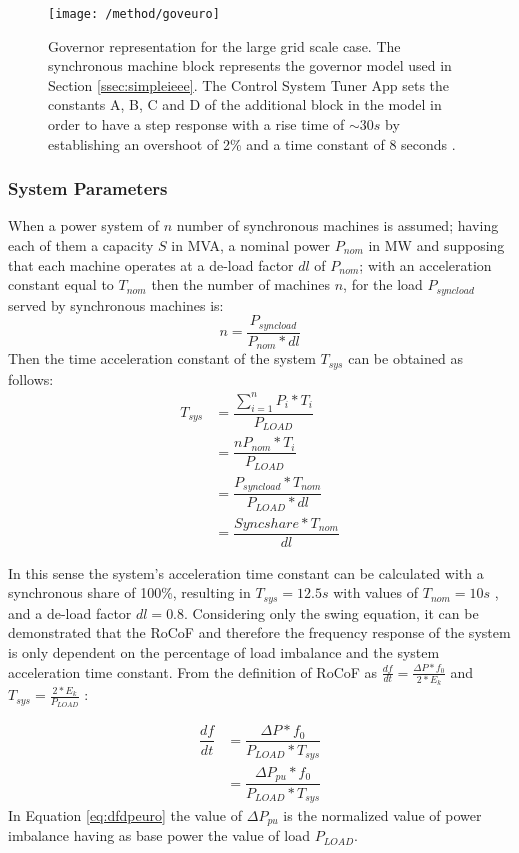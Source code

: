\begin{figure}[h]
	\centering
	\texttt{[image: /method/goveuro]}
	\caption{Governor representation for the large grid scale case. The synchronous machine block represents the governor model used in Section \ref{ssec:simpleieee}. The Control System Tuner App sets the constants A, B, C and D of the additional block in the model in order to have a step response with a rise time of $ \sim30s $ by establishing an overshoot of 2\%  and a time constant of 8 seconds \cite{ogata1999ingenieria}.}
	\label{fig:goveuro}
\end{figure}




\subsubsection{System Parameters}

When a power system of $ n $ number of synchronous machines is assumed; having each of them a capacity $ S $ in MVA, a nominal power $ P_{nom} $ in MW and
supposing that each machine operates at a de-load factor $ dl $ of $ P_{nom} $; with an acceleration constant equal to $ T_{nom} $ then the number of machines $ n $, for the load $ P_{syncload} $ served by synchronous machines is:
\begin{equation}
	n=\dfrac{P_{syncload}}{P_{nom}*dl}
\end{equation}
Then the time acceleration constant of the system $ T_{sys} $ can be obtained as follows:
\begin{align}
	T_{sys} &=\dfrac{\sum_{i=1}^nP_i*T_i}{P_{LOAD}}\nonumber  \\
	 &=\dfrac{nP_{nom}*T_i}{P_{LOAD}}\nonumber \\
	&=\dfrac{P_{syncload}*T_{nom}}{P_{LOAD}*dl}\nonumber\\
		&=\dfrac{Sync share*T_{nom}}{dl} \label{eq:tsyseuro}
\end{align}




In this sense the system's acceleration time constant can be calculated with a synchronous share of 100\%, resulting in $ T_{sys}=12.5s $   with values of $ T_{nom}=10s $  \cite{ENTSOE.2016, Anderson.2002}, and a de-load factor $ dl=0.8 $. Considering only the swing equation, it can be demonstrated that the RoCoF and therefore the frequency response of the system is only dependent on the percentage of load imbalance and the system acceleration time constant.
From the definition of RoCoF as $ \frac{df}{dt}=\frac{\Delta P*f_0}{2*E_k} $ and  $ T_{sys}=\frac{2*E_k}{P_{LOAD}} $ :

\begin{align}
	\dfrac{df}{dt} &=\dfrac{\Delta P*f_0}{P_{LOAD}*T_{sys}} \nonumber\\
	&=\dfrac{\Delta P_{pu}*f_0}{P_{LOAD}*T_{sys}}
	\label{eq:dfdpeuro}
\end{align}
In Equation \eqref{eq:dfdpeuro} the value of $ \Delta P_{pu} $ is the normalized value of power imbalance having as base power the value of load $ P_{LOAD} $. 
